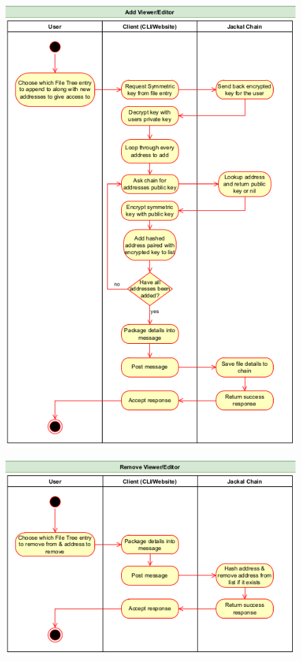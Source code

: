 \documentclass[a4paper]{article}
\begin{document}
\begin{figure}[!htbp]
\centering
\includegraphics[width=1\textwidth]{assets/filetree4.png}
\caption{}
\end{figure}

\begin{figure}[!htbp]
\centering
\includegraphics[width=1\textwidth]{assets/filetree5.png}
\caption{}
\end{figure}
\end{document}
